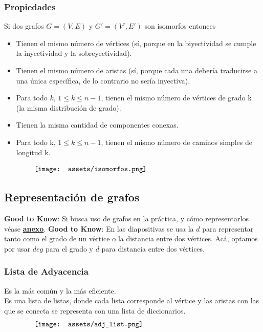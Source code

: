 \documentclass[10pt,a4paper]{article}
\begin{document}
\subsubsection*{Propiedades}
Si dos grafos $G = (V,E)$ y $G' = (V', E')$ son isomorfos entonces
\begin{itemize}
    \item Tienen el mismo número de vértices (sí, porque en la biyectividad se cumple la inyectividad y la sobreyectividad).
    \item Tienen el mismo número de aristas (sí, porque cada una debería traducirse a una única específica, de lo contrario no sería inyectiva).
    \item Para todo $k$, $1 \le k \le n-1$, tienen el mismo número de vértices de grado k (la misma distribución de grado).
    \item Tienen la misma cantidad de componentes conexas.
    \item Para todo k, $1 \le k \le n-1$, tienen el mismo número de caminos simples de longitud k.
\end{itemize}
\[\begin{minipage}[b]{0.8\textwidth}
    \texttt{[image: assets/isomorfos.png]}
\end{minipage}\]
\subsection*{Representación de grafos}
\textbf{Good to Know}: Si busca uso de grafos en la práctica, y cómo representarlos véase \hyperref[subsec:representacion_grafos_practica]{\textbf{anexo}}.
\textbf{Good to Know}: En las diapositivas se usa la $d$ para representar tanto como el grado de un vértice o la distancia entre dos vértices. Acá, optamos por usar $deg$ para el grado y $d$ para distancia entre dos vértices.
\subsubsection*{Lista de Adyacencia}
Es la más común y la más eficiente. \\
Es una lista de listas, donde cada lista corresponde al vértice y las aristas con las que se conecta se representa con una lista de diccionarios. 
\[\begin{minipage}[b]{0.8\textwidth}
    \texttt{[image: assets/adj\_list.png]}
\end{minipage}\]
\end{document}
